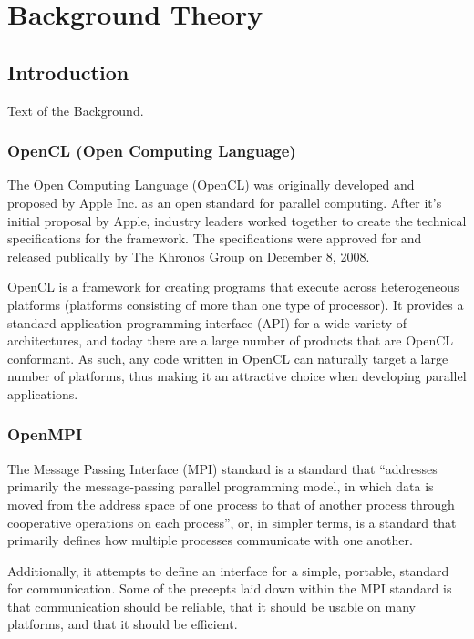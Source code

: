 
\chapter{Background Theory}

\label{ch:background}

\section{Introduction}

Text of the Background.


    \subsection{OpenCL (Open Computing Language)} %
    \label{sub:opencl}
        The Open Computing Language (OpenCL) was originally developed and proposed by Apple Inc. as an open standard for parallel computing. After it's initial proposal by Apple, industry leaders worked together to create the technical specifications for the framework. The specifications were approved for and released publically by The Khronos Group on December 8, 2008\cite{opencl10pressrelease}.

        OpenCL is a framework for creating programs that execute across heterogeneous platforms (platforms consisting of more than one type of processor). It provides a standard application programming interface (API) for a wide variety of architectures, and today there are a large number of products that are OpenCL conformant\cite{khronosconformance}. As such, any code written in OpenCL can naturally target a large number of platforms, thus making it an attractive choice when developing parallel applications.  

    \subsection{OpenMPI} %
    \label{sub:openmpi}
        The Message Passing Interface (MPI) standard is a standard that ``addresses primarily the message-passing parallel programming model, in which data is moved from the address space of one process to that of another process through cooperative operations on each process''\cite{MPI-2.2}, or, in simpler terms, is a standard that primarily defines how multiple processes communicate with one another. 

        Additionally, it attempts to define an interface for a simple, portable, standard for communication. Some of the precepts laid down within the MPI standard is that communication should be reliable, that it should be usable on many platforms, and that it should be efficient.

